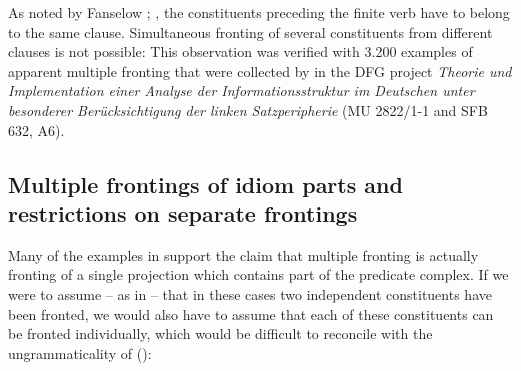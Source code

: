 As noted by Fanselow \citeyearpar[]{Fanselow87a}; \citeyearpar[]{Fanselow93a}, the constituents preceding the finite verb have to belong to
the same clause. Simultaneous fronting of several constituents from different clauses is not possible:
\eal
\label{ex-mult-front-same-verb}
\zl
This observation was verified with 3.200 examples of apparent multiple fronting that were collected by \citet{Bildhauer2011a}
in the DFG project \emph{Theorie und Implementation einer Analyse der Informationsstruktur im Deutschen unter besonderer Berücksichtigung der linken Satzperipherie} (MU 2822/1-1 and SFB 632, A6).



\subsection{Multiple frontings of idiom parts and restrictions on separate frontings}
\label{sec-idiom-parts-mf}

Many of the examples in  support the claim that multiple fronting is actually fronting of a single
projection which contains part of the predicate complex. If we were to assume -- as in  -- that in these
cases two independent constituents have been fronted, we would also have to assume that each of these constituents can be fronted
individually, which would be difficult to reconcile with the ungrammaticality of ():

